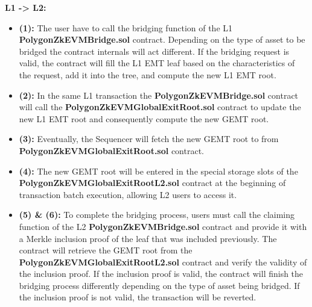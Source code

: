 \textbf{L1 -> L2:}
\begin{itemize}
	\item \textbf{(1):} The user have to call the bridging function of the L1 \textbf{PolygonZkEVMBridge.sol} contract. Depending on the type of asset to be bridged the contract internals will act different. If the bridging request is valid, the contract will fill the L1 EMT leaf based on the characteristics of the request, add it into the tree, and compute the new L1 EMT root.
	\item \textbf{(2):} In the same L1 transaction the \textbf{PolygonZkEVMBridge.sol} contract will call the \textbf{PolygonZkEVMGlobalExitRoot.sol} contract to update the new L1 EMT root and consequently compute the new GEMT root.
	\item \textbf{(3):} Eventually, the Sequencer will fetch the new GEMT root to from \textbf{PolygonZkEVMGlobalExitRoot.sol} contract.
	\item \textbf{(4):} The new GEMT root will be entered in the special storage slots of the \textbf{PolygonZkEVMGlobalExitRootL2.sol} contract at the beginning of transaction batch execution, allowing L2 users to access it. 
	\item \textbf{(5) \& (6):} To complete the bridging process, users must call the claiming function of the L2 \textbf{PolygonZkEVMBridge.sol} contract and provide it with a Merkle inclusion proof of the leaf that was included previously. The contract will retrieve the GEMT root from the \textbf{PolygonZkEVMGlobalExitRootL2.sol} contract and verify the validity of the inclusion proof. If the inclusion proof is valid, the contract will finish the bridging process differently depending on the type of asset being bridged. If the inclusion proof is not valid, the transaction will be reverted.

\end{itemize}

